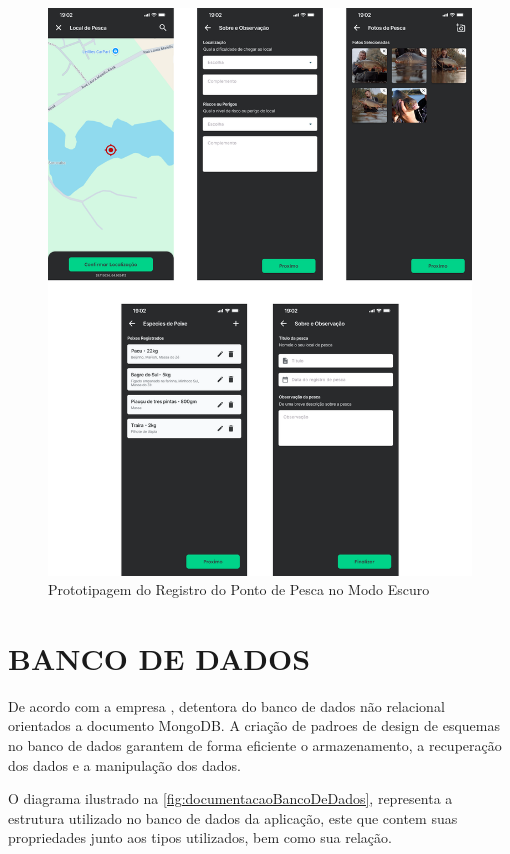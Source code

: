 \begin{figure}[H]
    \centering
    \caption{Prototipagem do Registro do Ponto de Pesca no Modo Escuro}
    \label{fig:prototipagemSpotRegisterDark}
    \includegraphics[scale=0.30]{./dados/figuras/prototipagem-dark-spot-register.png}
\end{figure}

\section{BANCO DE DADOS}
\label{sec:desenvolvimentobancodedados}

De acordo com a empresa , detentora do banco de dados não relacional orientados a documento MongoDB. A criação de padroes de design de esquemas no banco de dados garantem de forma eficiente o armazenamento, a recuperação dos dados e a manipulação dos dados.

O diagrama ilustrado na \autoref{fig:documentacaoBancoDeDados}, representa a estrutura utilizado no banco de dados da aplicação, este que contem suas propriedades junto aos tipos utilizados, bem como sua relação.


